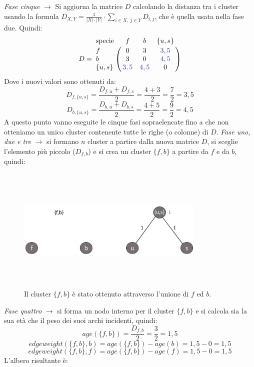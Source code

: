 \newline
\textit{Fase cinque} $\rightarrow$ Si aggiorna la matrice $D$ calcolando la distanza tra i cluster usando la formula $D_{X,Y}=\frac{1}{\left | X \right |\cdot \left | Y \right |} \cdot \sum_{i\in X,\: j\in Y}D_{i,j}$, che è quella usata nella fase due. Quindi:
\[
D = \bordermatrix{\text{specie}&f&b&\{u, s\}\cr
                f& 0 & 3 & {\color{Blue} 3,5}\cr
                b& 3 & 0 & {\color{Blue} 4,5}\cr
                \{u, s\}& {\color{Blue} 3,5} & {\color{Blue} 4,5} & 0}
\]
Dove i nuovi valori sono ottenuti da:
\[D_{f, \{u, s\}}=\frac{D_{f,u}+D_{f,s}}{2}=\frac{4+3}{2}=\frac{7}{2}=3,5\]
\[D_{b, \{u, s\}}=\frac{D_{b,u}+D_{b,s}}{2}=\frac{4+5}{2}=\frac{9}{2}=4,5\]
A questo punto vanno eseguite le cinque fasi sopraelencate fino a che non otteniamo un unico cluster contenente tutte le righe (o colonne) di $D$.
\newline
\textit{Fase uno, due e tre} $\rightarrow$  si formano $n$ cluster a partire dalla nuova matrice $D$, si sceglie l'elemento più piccolo ($D_{f, b}$) e si crea un cluster $\{f, b\}$ a partire da $f$ e da $b$, quindi:
\begin{figure}[h!]
\centering
	\includegraphics[height=6cm, width=9cm,keepaspectratio]{rooted_upgma_5.jpg}
 	\caption{Il cluster $\{f, b\}$ è stato ottenuto attraverso l'unione di $f$ ed $b$.}
  	\label{fig:rooted_upgma_5}
\end{figure}
\newline 
\textit{Fase quattro} $\rightarrow$ si forma un nodo interno per il cluster $\{f, b\}$ e si calcola sia la sua età che il peso dei suoi archi incidenti, quindi:
\[age(\{f, b\})=\frac{D_{f,b}}{2}=\frac{3}{2}=1,5\]
\[edgeweight(\{f, b\},b)=age(\{f, b\})-age(b)=1,5-0=1,5\]
\[edgeweight(\{f, b\},f)=age(\{f, b\})-age(f)=1,5-0=1,5\]
L'albero risultante è:
